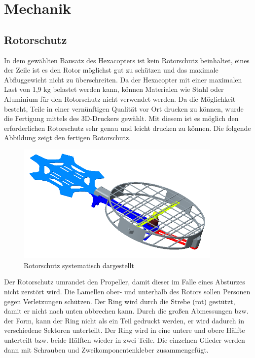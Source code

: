 \chapter{Mechanik}

\renewcommand{\kapitelautor}{Autor: Alexander Punz}

\section{Rotorschutz}
In dem gewählten Bausatz des Hexacopters ist kein Rotorschutz beinhaltet, eines der Zeile ist es den Rotor möglichst gut zu schützen und das maximale Abfluggewicht nicht zu überschreiten. Da der Hexacopter mit einer maximalen Last von 1,9 kg belastet werden kann, können Materialen wie Stahl oder Aluminium für den Rotorschutz nicht verwendet werden. 
Da die Möglichkeit besteht, Teile in einer vernünftigen Qualität vor Ort drucken zu können, wurde die Fertigung mittels des 3D-Druckers gewählt. Mit diesem ist es möglich den erforderlichen Rotorschutz sehr genau und leicht drucken zu können. 
Die folgende Abbildung zeigt den fertigen Rotorschutz.

\begin{figure}[tbh]
\begin{centering}
\includegraphics[width = 100mm]{Bilder/rotorschutz_zusammenbau}
\par\end{centering}
\caption{Rotorschutz systematisch dargestellt}
\label{Rotorschutz}
\end{figure}

Der Rotorschutz umrandet den Propeller, damit dieser im Falle eines Absturzes nicht zerstört wird. Die Lamellen ober- und unterhalb des Rotors sollen Personen gegen Verletzungen schützen. 
Der Ring wird durch die Strebe (rot) gestützt, damit er nicht nach unten abbrechen kann. 
Durch die großen Abmessungen bzw. der Form, kann der Ring nicht als ein Teil gedruckt werden, er wird dadurch in verschiedene Sektoren unterteilt. Der Ring wird in eine untere und obere Hälfte unterteilt bzw. beide Hälften wieder in zwei Teile. Die einzelnen Glieder werden dann mit Schrauben und Zweikomponentenkleber zusammengefügt. 

